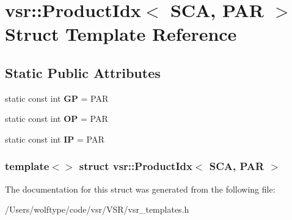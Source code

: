 \hypertarget{structvsr_1_1_product_idx_3_01_s_c_a_00_01_p_a_r_01_4}{\section{vsr\-:\-:Product\-Idx$<$ S\-C\-A, P\-A\-R $>$ Struct Template Reference}
\label{structvsr_1_1_product_idx_3_01_s_c_a_00_01_p_a_r_01_4}
}
\subsection*{Static Public Attributes}
\begin{DoxyCompactItemize}
\item 
\hypertarget{structvsr_1_1_product_idx_3_01_s_c_a_00_01_p_a_r_01_4_ac99a1ed81c249f9fda84b959569aebfd}{static const int {\bfseries G\-P} = P\-A\-R}\label{structvsr_1_1_product_idx_3_01_s_c_a_00_01_p_a_r_01_4_ac99a1ed81c249f9fda84b959569aebfd}

\item 
\hypertarget{structvsr_1_1_product_idx_3_01_s_c_a_00_01_p_a_r_01_4_ae28c8a4c7bbf984b473f954a68808e34}{static const int {\bfseries O\-P} = P\-A\-R}\label{structvsr_1_1_product_idx_3_01_s_c_a_00_01_p_a_r_01_4_ae28c8a4c7bbf984b473f954a68808e34}

\item 
\hypertarget{structvsr_1_1_product_idx_3_01_s_c_a_00_01_p_a_r_01_4_ad41a4e81eef1abd1662d663ee78e52b6}{static const int {\bfseries I\-P} = P\-A\-R}\label{structvsr_1_1_product_idx_3_01_s_c_a_00_01_p_a_r_01_4_ad41a4e81eef1abd1662d663ee78e52b6}

\end{DoxyCompactItemize}
\subsubsection*{template$<$$>$ struct vsr\-::\-Product\-Idx$<$ S\-C\-A, P\-A\-R $>$}



The documentation for this struct was generated from the following file\-:\begin{DoxyCompactItemize}
\item 
/\-Users/wolftype/code/vsr/\-V\-S\-R/vsr\-\_\-templates.\-h\end{DoxyCompactItemize}
